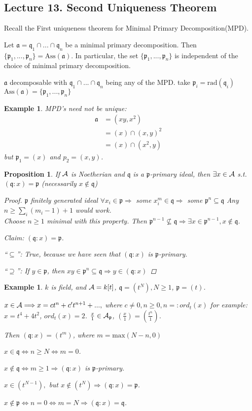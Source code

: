 \documentclass[11pt]{article}
\newtheorem{prop}[thm]{Proposition}
\newtheorem{ex}[thm]{Example}
\newcommand{\sca}{{\mathfrak a}}
\newcommand{\scp}{{\mathfrak p}}
\newcommand{\scq}{\mathfrak q}
\newcommand{\cala}{{\cal A}}
\newcommand{\Lrta}{\Longrightarrow}
\newcommand{\Llrta}{\Longleftrightarrow}
\begin{document}
\subsection{Lecture 13. Second Uniqueness Theorem}
Recall the 
First uniqueness theorem for Minimal Primary Decomposition(MPD).

Let $\sca=\scq_1\cap...\cap\scq_n$ be a minimal primary decomposition. Then $\{\scp_1,...,\scp_n\}=\text{Ass}(  \sca)$. In particular, the set $\{\scp_1,...,\scp_n\}$ is independent of the choice of minimal primary decomposition.

$\sca$ decomposable with $\scq_1\cap...\cap \scq_n$ being any of the MPD. take $\scp_i=\text{rad}(\scq_i)$
$\text{Ass}(  \sca)=\{\scp_1,...,\scp_n\}$

\begin{ex}
MPD's need not be unique:
$$
\begin{aligned}
\sca&=(xy,x^2)\\
&=(x)\cap (x,y)^2\\
& =(x)\cap (x^2,y)
\end{aligned}
$$
but $\scp_1=(x)$ and $p_2=(x,y)$.
\end{ex}

\begin{prop}\label{prop:Noetherian_primary_quotint}
If $\cala$ is Noetherian and $\scq$ is a $\scp$-primary ideal, then $\exists x\in\cala$ s.t. $(\scq:x)=\scp$ (necessarily $x\notin \scq$)
\begin{proof}
$\scp$ finitely generated ideal $\forall x_i\in\scp\Lrta$ some $x_i^m\in\scq\Lrta $ some $\scp^n\subseteq \scq$ Any $n\geq \sum_i (m_i-1)+1$ would work.  \\
Choose $n\geq 1$ minimal with this property. Then $\scp^{n-1}\not\subseteq\scq\Lrta \exists x\in\scp^{n-1},x\notin\scq$.

Claim: $(\scq:x)=\scp$.

``$\subseteq$'': True, because we have seen that $(\scq:x)$ is $\scp$-primary.

``$\supseteq$'': If $y\in\scp$, then $xy\in\scp^n\subseteq \scq\Lrta y\in(\scq:x)$
\end{proof}
\end{prop}

\begin{ex}
$k$ is field, and $\cala=k[t]$, $\scq=(t^N),N\geq 1$, $\scp=(t)$.

$x\in\cala\Lrta x=c t^n+c' t^{n+1}+...,$ where $c\neq 0, n\geq 0, n=:ord_t(x)$
for example: $x=t^4+4t^2$, $ord_t(x)=2$.
$\frac{x}{1}\in\cala_\scp$, $\left(\frac{x}{1}\right)=\left(\frac{t^n}{1}\right)$.

Then $(\scq:x)=(t^m)$, where $m=\text{max}(N-n,0)$

$x\in\scq\Llrta n\geq N\Llrta m=0$.

$x\notin\scq\Llrta m\geq 1\Lrta (\scq:x)$ is $\scp$-primary.

$x\in(t^{N-1}),$ but $x\notin(t^N)\Lrta(\scq:x)=\scp$.

$x\notin\scp\Llrta n=0\Llrta m=N\Lrta (\scq:x)=\scq$.
\end{ex}
\end{document}
